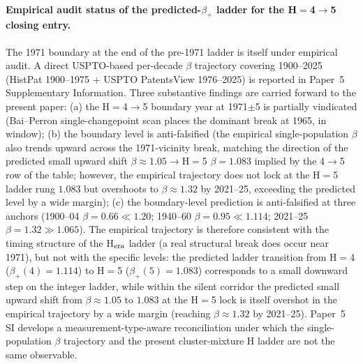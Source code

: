 \paragraph{Empirical audit status of the predicted-\(\beta_+\) ladder for the H${=}$4$\to$5 closing entry.} The 1971 boundary at the end of the pre-1971 ladder is itself under empirical audit. A direct USPTO-based per-decade \(\beta\) trajectory covering 1900--2025 (HistPat 1900--1975 + USPTO PatentsView 1976--2025) is reported in Paper~5 Supplementary Information. Three substantive findings are carried forward to the present paper: (a) the H${=}$4$\to$5 boundary year at 1971\(\pm\)5 is partially vindicated (Bai--Perron single-changepoint scan places the dominant break at 1965, in window); (b) the boundary level is anti-falsified (the empirical single-population \(\beta\) also trends upward across the 1971-vicinity break, matching the direction of the predicted small upward shift \(\beta\!\approx\!1.05\!\to\!\)H${=}$5 \(\beta\!=\!1.083\) implied by the 4$\to$5 row of the table; however, the empirical trajectory does not lock at the H${=}$5 ladder rung \(1.083\) but overshoots to \(\beta\!\approx\!1.32\) by 2021--25, exceeding the predicted level by a wide margin); (c) the boundary-level prediction is anti-falsified at three anchors (1900--04 \(\beta=0.66 \ll 1.20\); 1940--60 \(\beta=0.95 \ll 1.114\); 2021--25 \(\beta=1.32 \gg 1.065\)). The empirical trajectory is therefore consistent with the timing structure of the H$_{\rm era}$ ladder (a real structural break does occur near 1971), but not with the specific levels: the predicted ladder transition from H${=}$4 ($\beta_+(4)=1.114$) to H${=}$5 ($\beta_+(5)=1.083$) corresponds to a small downward step on the integer ladder, while within the silent corridor the predicted small upward shift from $\beta\!\approx\!1.05$ to $1.083$ at the H${=}$5 lock is itself overshot in the empirical trajectory by a wide margin (reaching $\beta\!\approx\!1.32$ by 2021--25). Paper~5 SI develops a measurement-type-aware reconciliation under which the single-population \(\beta\) trajectory and the present cluster-mixture H ladder are not the same observable.

